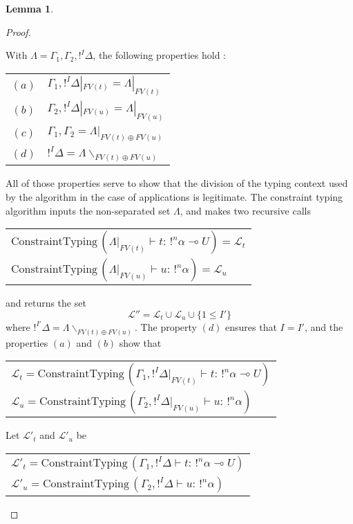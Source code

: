 \documentclass[10pt]{article}
\theoremstyle{plain}
\theoremstyle{definition}
\newtheorem{lemma}{Lemma}[section]
\begin{document}
\begin{lemma}
\begin{proof}
\begin{itemize}
				With $\Lambda = \Gamma_1, \Gamma_2, !^I \Delta$, the following properties hold :
					\begin{center}
					\begin{tabular}{cl}
						$(a)$ & $ \Gamma_1, !^I\Delta|_{FV(t)} = \Lambda |_{FV(t)} $ \\
						$(b)$ & $ \Gamma_2, !^I\Delta|_{FV(u)} = \Lambda |_{FV(u)} $	\\
						$(c)$ & $ \Gamma_1, \Gamma_2 = \Lambda |_{FV(t) \oplus FV(u)} $ \\
						$(d)$ & $ !^I \Delta = \Lambda \backslash_{FV(t) \oplus FV(u)} $
					\end{tabular}
					\end{center}
			 	All of those properties serve to show that the division of the typing context used by the algorithm in the case of applications
			 	is legitimate. The constraint typing algorithm inputs the non-separated set $\Lambda$, and makes two recursive calls
			 		\begin{center}
			 		\begin{tabular}{l}
			 			$\text{ConstraintTyping} \, (\Lambda |_{FV(t)} \vdash t : \, !^n\alpha \multimap U) = \mathcal{L}_t$ \\
			 			$\text{ConstraintTyping} \, (\Lambda |_{FV(u)} \vdash u : \, !^n\alpha) = \mathcal{L}_u$
			 		\end{tabular}
			 		\end{center}
			 	and returns the set
			 		$$ \mathcal{L''} = \mathcal{L}_t \cup \mathcal{L}_u \cup \{ 1 \le I' \} $$
			 	where $!^{I'} \Delta = \Lambda \backslash_{FV(t) \oplus FV(u)}$.
			 	The property $(d)$ ensures that $I = I'$, and the properties $(a)$ and $(b)$ show that
			 		\begin{center}
			 		\begin{tabular}{l}
			 			$\mathcal{L}_t = \text{ConstraintTyping} \, (\Gamma_1, !^I \Delta |_{FV(t)} \vdash t : \, !^n\alpha \multimap U)$ \\
			 			$\mathcal{L}_u = \text{ConstraintTyping} \, (\Gamma_2, !^I \Delta |_{FV(u)} \vdash u : \, !^n\alpha)$
			 		\end{tabular}
			 		\end{center}
			 	Let $\mathcal{L'}_t$ and $\mathcal{L'}_u$ be
			 		\begin{center}
			 		\begin{tabular}{l}
			 			$\mathcal{L'}_t = \text{ConstraintTyping} \, (\Gamma_1, !^I \Delta \vdash t : \, !^n\alpha \multimap U)$ \\
			 			$\mathcal{L'}_u = \text{ConstraintTyping} \, (\Gamma_2, !^I \Delta \vdash u : \, !^n\alpha)$

\end{tabular}
\end{center}
\end{itemize}
\end{proof}
\end{lemma}
\end{document}
